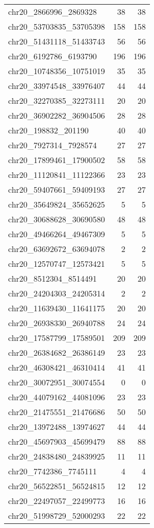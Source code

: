 \begin{longtable}{lrr}
chr20_2866996_2869328 & 38 & 38 \\
chr20_53703835_53705398 & 158 & 158 \\
chr20_51431118_51433743 & 56 & 56 \\
chr20_6192786_6193790 & 196 & 196 \\
chr20_10748356_10751019 & 35 & 35 \\
chr20_33974548_33976407 & 44 & 44 \\
chr20_32270385_32273111 & 20 & 20 \\
chr20_36902282_36904506 & 28 & 28 \\
chr20_198832_201190 & 40 & 40 \\
chr20_7927314_7928574 & 27 & 27 \\
chr20_17899461_17900502 & 58 & 58 \\
chr20_11120841_11122366 & 23 & 23 \\
chr20_59407661_59409193 & 27 & 27 \\
chr20_35649824_35652625 & 5 & 5 \\
chr20_30688628_30690580 & 48 & 48 \\
chr20_49466264_49467309 & 5 & 5 \\
chr20_63692672_63694078 & 2 & 2 \\
chr20_12570747_12573421 & 5 & 5 \\
chr20_8512304_8514491 & 20 & 20 \\
chr20_24204303_24205314 & 2 & 2 \\
chr20_11639430_11641175 & 20 & 20 \\
chr20_26938330_26940788 & 24 & 24 \\
chr20_17587799_17589501 & 209 & 209 \\
chr20_26384682_26386149 & 23 & 23 \\
chr20_46308421_46310414 & 41 & 41 \\
chr20_30072951_30074554 & 0 & 0 \\
chr20_44079162_44081096 & 23 & 23 \\
chr20_21475551_21476686 & 50 & 50 \\
chr20_13972488_13974627 & 44 & 44 \\
chr20_45697903_45699479 & 88 & 88 \\
chr20_24838480_24839925 & 11 & 11 \\
chr20_7742386_7745111 & 4 & 4 \\
chr20_56522851_56524815 & 12 & 12 \\
chr20_22497057_22499773 & 16 & 16 \\
chr20_51998729_52000293 & 22 & 22 \\

\end{longtable}
